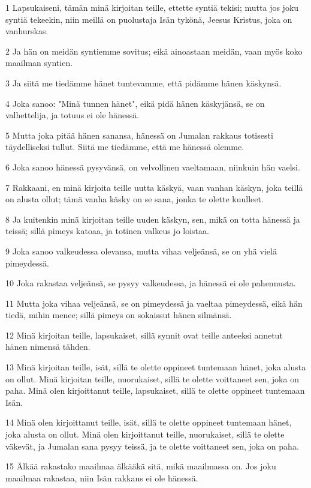 \par 1 Lapsukaiseni, tämän minä kirjoitan teille, ettette syntiä tekisi; mutta jos joku syntiä tekeekin, niin meillä on puolustaja Isän tykönä, Jeesus Kristus, joka on vanhurskas.
\par 2 Ja hän on meidän syntiemme sovitus; eikä ainoastaan meidän, vaan myös koko maailman syntien.
\par 3 Ja siitä me tiedämme hänet tuntevamme, että pidämme hänen käskynsä.
\par 4 Joka sanoo: "Minä tunnen hänet", eikä pidä hänen käskyjänsä, se on valhettelija, ja totuus ei ole hänessä.
\par 5 Mutta joka pitää hänen sanansa, hänessä on Jumalan rakkaus totisesti täydelliseksi tullut. Siitä me tiedämme, että me hänessä olemme.
\par 6 Joka sanoo hänessä pysyvänsä, on velvollinen vaeltamaan, niinkuin hän vaelsi.
\par 7 Rakkaani, en minä kirjoita teille uutta käskyä, vaan vanhan käskyn, joka teillä on alusta ollut; tämä vanha käsky on se sana, jonka te olette kuulleet.
\par 8 Ja kuitenkin minä kirjoitan teille uuden käskyn, sen, mikä on totta hänessä ja teissä; sillä pimeys katoaa, ja totinen valkeus jo loistaa.
\par 9 Joka sanoo valkeudessa olevansa, mutta vihaa veljeänsä, se on yhä vielä pimeydessä.
\par 10 Joka rakastaa veljeänsä, se pysyy valkeudessa, ja hänessä ei ole pahennusta.
\par 11 Mutta joka vihaa veljeänsä, se on pimeydessä ja vaeltaa pimeydessä, eikä hän tiedä, mihin menee; sillä pimeys on sokaissut hänen silmänsä.
\par 12 Minä kirjoitan teille, lapsukaiset, sillä synnit ovat teille anteeksi annetut hänen nimensä tähden.
\par 13 Minä kirjoitan teille, isät, sillä te olette oppineet tuntemaan hänet, joka alusta on ollut. Minä kirjoitan teille, nuorukaiset, sillä te olette voittaneet sen, joka on paha. Minä olen kirjoittanut teille, lapsukaiset, sillä te olette oppineet tuntemaan Isän.
\par 14 Minä olen kirjoittanut teille, isät, sillä te olette oppineet tuntemaan hänet, joka alusta on ollut. Minä olen kirjoittanut teille, nuorukaiset, sillä te olette väkevät, ja Jumalan sana pysyy teissä, ja te olette voittaneet sen, joka on paha.
\par 15 Älkää rakastako maailmaa älkääkä sitä, mikä maailmassa on. Jos joku maailmaa rakastaa, niin Isän rakkaus ei ole hänessä.
